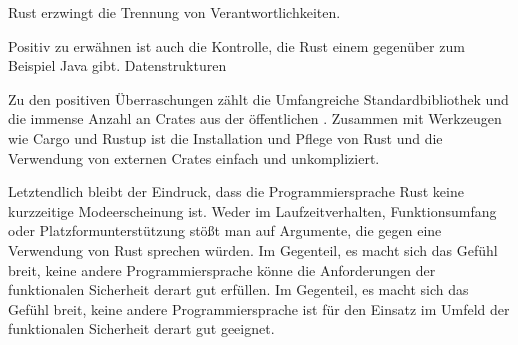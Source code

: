 Rust erzwingt die Trennung von Verantwortlichkeiten.


Positiv zu erwähnen ist auch die Kontrolle, die Rust einem gegenüber zum Beispiel Java gibt.
Datenstrukturen

Zu den positiven Überraschungen zählt die Umfangreiche Standardbibliothek und die immense Anzahl an Crates aus der öffentlichen .
Zusammen mit Werkzeugen wie Cargo und Rustup ist die Installation und Pflege von Rust und die Verwendung von externen Crates  einfach und unkompliziert.

Letztendlich bleibt der Eindruck, dass die Programmiersprache Rust keine kurzzeitige Modeerscheinung ist.
Weder im Laufzeitverhalten, Funktionsumfang oder Platzformunterstützung stößt man auf Argumente, die gegen eine Verwendung von Rust sprechen würden.
Im Gegenteil, es macht sich das Gefühl breit, keine andere Programmiersprache könne die Anforderungen der funktionalen Sicherheit derart gut erfüllen.
Im Gegenteil, es macht sich das Gefühl breit, keine andere Programmiersprache ist für den Einsatz im Umfeld der funktionalen Sicherheit derart gut geeignet.








